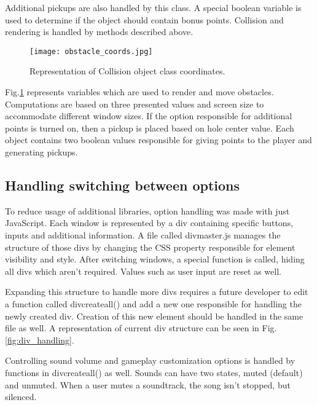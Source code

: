 \documentclass[oneside,a4paper,11pt]{report}
\begin{document}
\par
Additional pickups are also handled by this class. A special boolean variable is used to determine if the object should contain bonus points. Collision and rendering is handled by methods described above.

\begin{figure}
	\centering
	\texttt{[image: obstacle\_coords.jpg]}
	\caption{Representation of Collision object class coordinates.\label{fig:collision}}
\end{figure}

\par
Fig.\ref{fig:collision} represents variables which are used to render and move obstacles. Computations are based on three presented values and screen size to accommodate different window sizes. If the option responsible for additional points is turned on, then a pickup is placed based on hole center value. Each object contains two boolean values responsible for giving points to the player and generating pickups.

\subsection{Handling switching between options}
To reduce usage of additional libraries, option handling was made with just JavaScript. Each window is represented by a div containing specific buttons, inputs and additional information. A file called div\textunderscore master.js manages the structure of those divs by changing the CSS property responsible for element visibility and style. After switching windows, a special function is called, hiding all divs which aren't required. Values such as user input are reset as well.

\par
Expanding this structure to handle more divs requires a future developer to edit a function called div\textunderscore create\textunderscore all() and add a new one responsible for handling the newly created div. Creation of this new element should be handled in the same file as well. A representation of current div structure can be seen in Fig.\ref{fig:div_handling}.

\par
Controlling sound volume and gameplay customization options is handled by functions in div\textunderscore create\textunderscore all() as well. Sounds can have two states, muted (default) and unmuted. When a user mutes a soundtrack, the song isn't stopped, but silenced.
\end{document}

